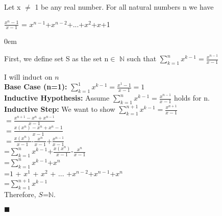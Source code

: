 \documentclass[12pt]{article}
\renewcommand{\qed}{\hfill$\blacksquare$}
\renewenvironment{proof}{\begin{addmargin}[1em]{0em}\begin{newproof}}{\end{newproof}\end{addmargin}\qed}
\newenvironment{theorem}[2][Theorem]{\begin{trivlist}
\item[\hskip \labelsep {\bfseries #1}\hskip \labelsep {\bfseries #2.}]}{\end{trivlist}}
\begin{document}
\begin{theorem}{10.9}

Let x $\neq$ 1 be any real number. For all natural numbers n we have 
	
$\frac{x^{n}-1}{x-1}$ = ${x^{n-1}}$+${x^{n-2}}$+...+$x^{2}$+$x$+1

\end{theorem}

\begin{proof}[Proof]
First, we define set S as the set {n$\in$ $\mathbb{N}$} such that $\sum_{k=1}^{n}x^{k-1}= \frac{x^{n-1}}{x-1}$ 

I will induct on $n$ \\
\textbf{Base Case (n=1): } $\sum_{k=1}^{1}x^{k-1} = \frac{x^{1}-1}{x-1}=1$\\

\textbf{Inductive Hypothesis: } Assume $\sum_{k=1}^{n}x^{k-1}= \frac{x^{n-1}}{x-1}$ holds for n. \\

\textbf{Inductive Step: } We want to show $\sum_{k=1}^{n+1}x^{k-1}= \frac{x^{n+1}}{x-1}$ \\
$=\frac{x^{n+1}-x^{n}+x^{n-1}}{x-1}$\\
$=\frac{x(x^{n})-x^{n}+x^{n}-1}{x-1}$\\
$=\frac{x(x^{n})}{x-1}$-$\frac{x^{n}}{x-1}$+$\frac{x^{n-1}}{x-1}$\\
=$\sum_{k=1}^{n}x^{k-1}$+$\frac{x(x^{n})}{x-1}$-$\frac{x^{n}}{x-1}$\\
=$\sum_{k=1}^{n}x^{k-1}$+$x^{n}$\\
=$1$ + $x^{1}$ + $x^{2}$ + ... +$x^{n-2}$+$x^{n-1}$+$x^{n}$\\
=$\sum_{k=1}^{n+1}x^{k-1}$\\
Therefore, $S$=$\mathbb{N}$.

\end{proof}

 
\end{document}

